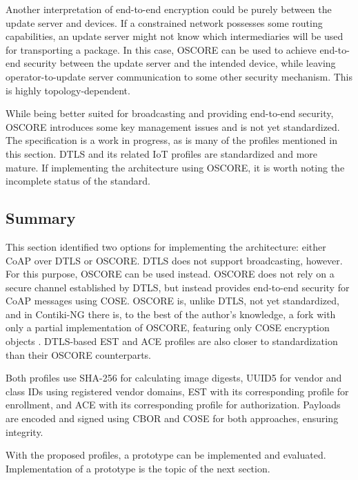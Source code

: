 \documentclass[0-thesis.tex]{subfiles}
\begin{document}
Another interpretation of end-to-end encryption could be purely between the update server
and devices. If a constrained network possesses some routing capabilities, an update
server might not know which intermediaries will be used for transporting a package. In
this case, OSCORE can be used to achieve end-to-end security between the update server and
the intended device, while leaving operator-to-update server communication to some other
security mechanism. This is highly topology-dependent.

While being better suited for broadcasting and providing end-to-end security, OSCORE
introduces some key management issues and is not yet standardized. The specification
\parencite{oscore} is a work in progress, as is many of the profiles mentioned in this
section. DTLS and its related IoT profiles are standardized and more mature. If
implementing the architecture using OSCORE, it is worth noting the incomplete status of
the standard.

\subsection{Summary}
\label{ssec:profiles-summary}
This section identified two options for implementing the architecture: either CoAP over
DTLS or OSCORE. DTLS does not support broadcasting, however. For this purpose, OSCORE can
be used instead. OSCORE does not rely on a secure channel established by DTLS, but instead
provides end-to-end security for CoAP messages using COSE. OSCORE is, unlike DTLS, not yet
standardized, and in Contiki-NG there is, to the best of the author's knowledge, a fork
with only a partial implementation of OSCORE, featuring only COSE encryption objects
\parencite{contiki-oscore}. DTLS-based EST and ACE profiles are also closer to
standardization than their OSCORE counterparts.

Both profiles use SHA-256 for calculating image digests, UUID5 for vendor and class IDs
using registered vendor domains, EST with its corresponding profile for enrollment, and
ACE with its corresponding profile for authorization. Payloads are encoded and signed
using CBOR and COSE for both approaches, ensuring integrity.

With the proposed profiles, a prototype can be implemented and evaluated. Implementation
of a prototype is the topic of the next section.
\end{document}
